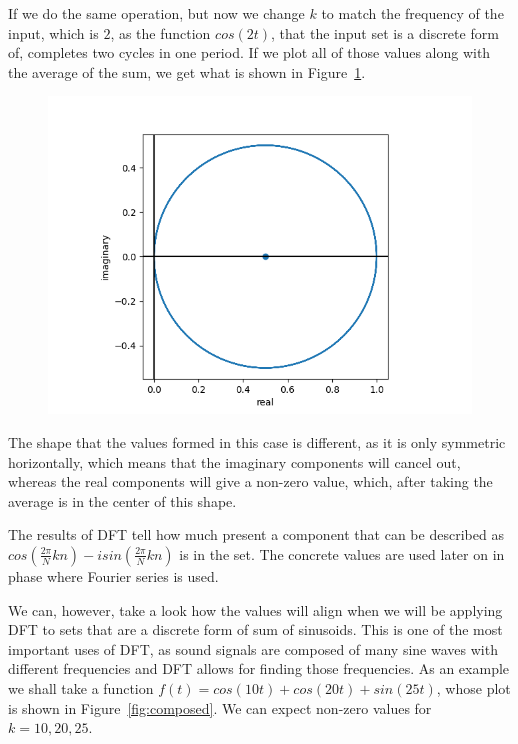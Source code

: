 \documentclass[titlepage]{article}
\begin{document}
    If we do the same operation, but now we change $k$ to match the frequency of
    the input, which is $2$, as the function $cos(2t)$, that the input set is a discrete
    form of, completes two cycles in one period. If we plot all of those values
    along with the average of the sum, we get what is shown in 
    Figure~\ref{fig:cos_wrapped_2k}.
    \begin{figure}[H]
        \caption{}
        \centering
        \includegraphics[width=0.4\linewidth]{cos_wrapped_2k}
        \label{fig:cos_wrapped_2k}
    \end{figure}
    The shape that the values formed in this case is different, as it is only 
    symmetric horizontally, which means that the imaginary components will cancel
    out, whereas the real components will give a non-zero value, which, after
    taking the average is in the center of this shape.


    The results of DFT tell how much present a component that can be described as
    $cos\left(\frac{2\pi}{N}kn\right) - isin\left( \frac{2\pi}{N}kn\right)$ is 
    in the set. The concrete values are used later on in phase where Fourier 
    series is used.


    We can, however, take a look how the values will align when we will be applying
    DFT to sets that are a discrete form of sum of sinusoids. This is one of the 
    most important uses of DFT, as sound signals are composed of many sine waves 
    with different frequencies and DFT allows for finding those frequencies. 
    As an example we shall take a function $f(t) = cos(10t) + cos(20t) + sin(25t)$, 
    whose plot is shown in Figure~\ref{fig:composed}. We can expect non-zero 
    values for $k = {10,20,25}$.
\end{document}
